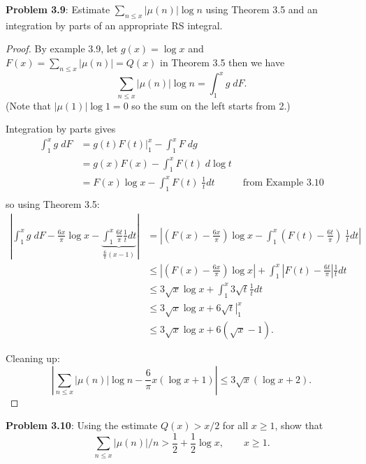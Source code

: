 \documentclass{article}
\newcommand{\Abs}[1]{\left| #1 \right|}
\begin{document}
\fi

\textbf{Problem 3.9}: Estimate $\sum_{n \leq x} |\mu(n)| \log n$ using Theorem 3.5 and an integration by parts of an appropriate RS integral.

\begin{proof}
By example 3.9, let $g(x) = \log x$ and $F(x) = \sum_{n \leq x} |\mu(n)| = Q(x)$ in Theorem 3.5 then we have
$$\sum_{n \leq x} |\mu(n)| \log n = \int_1^x g \; dF.$$
(Note that $|\mu(1)| \log 1 = 0$ so the sum on the left starts from 2.)

Integration by parts gives
\begin{align*}
\int_1^x g \; dF &= \left. g(t) F(t) \right|_1^x - \int_1^x F \; dg\\
&= g(x) F(x) - \int_1^x F(t) \; d \log t\\
&= F(x) \log x - \int_1^x F(t) \; \frac{1}{t} dt &\text{ from Example 3.10}\\
\end{align*}
so using Theorem 3.5:
\begin{align*}
\Abs{ \int_1^x g \; dF - \frac{6x}{\pi} \log x - \underbrace{\int_1^x \frac{6t}{\pi} \frac{1}{t} dt}_{\frac{6}{\pi} (x - 1) } } &= \Abs{ \left(F(x) - \frac{6x}{\pi} \right)\log x - \int_1^x \left( F(t) - \frac{6t}{\pi} \right) \; \frac{1}{t} dt }\\
&\leq \Abs{ \left(F(x) - \frac{6x}{\pi} \right)\log x } + \int_1^x \Abs { F(t) - \frac{6t}{\pi} } \frac{1}{t} dt\\
&\leq 3 \sqrt{x} \log x + \int_1^x 3 \sqrt{t} \frac{1}{t} dt\\
&\leq 3 \sqrt{x} \log x + \left. 6 \sqrt{t} \right|_1^x\\
&\leq 3 \sqrt{x} \log x + 6 (\sqrt{x} - 1).
\end{align*}

Cleaning up:
$$\Abs{ \sum_{n \leq x} |\mu(n)| \log n - \frac{6}{\pi} x (\log x + 1) } \leq 3 \sqrt{x} ( \log x + 2 ).$$ 
\end{proof}

\textbf{Problem 3.10}: Using the estimate $Q(x) > x/2$ for all $x \geq 1$, show that
$$\sum_{n \leq x} |\mu(n)|/n > \frac 12 + \frac 12 \log x, \qquad x \geq 1.$$
\end{document}
